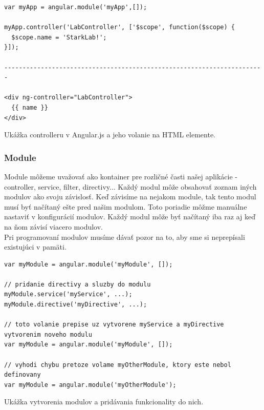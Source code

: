 \begin{algorithm}
\begin{lstlisting}
var myApp = angular.module('myApp',[]);

myApp.controller('LabController', ['$scope', function($scope) {
  $scope.name = 'StarkLab!';
}]);

-----------------------------------------------------------------------

<div ng-controller="LabController">
  {{ name }}
</div>
\end{lstlisting}
 \caption{Ukážka controlleru v Angular.js a jeho volanie na HTML elemente.}
 \label{angular-controller}
\end{algorithm}


\subsubsection{Module}
Module môžeme uvažovať ako kontainer pre rozličné časti našej aplikácie - controller, service, filter, directivy... Každý modul môže obsahovať zoznam iných modulov ako svoju závislosť. Keď závisíme na nejakom module, tak tento modul musí byť načítaný ešte pred našim modulom. Toto poriadie môžme manuálne nastaviť v konfigurácií modulov. Každý modul môže byť načítaný iba raz aj keď na ňom závisí viacero modulov.\cite{angular-docs}\\
Pri programovaní modulov musíme dávať pozor na to, aby sme si neprepísali existujúci v pamäti.

\begin{algorithm}
\begin{lstlisting}
var myModule = angular.module('myModule', []);

// pridanie directivy a sluzby do modulu
myModule.service('myService', ...);
myModule.directive('myDirective', ...);

// toto volanie prepise uz vytvorene myService a myDirective vytvorenim noveho modulu
var myModule = angular.module('myModule', []);

// vyhodi chybu pretoze volame myOtherModule, ktory este nebol definovany
var myModule = angular.module('myOtherModule');
\end{lstlisting}
 \caption{Ukážka vytvorenia modulov a pridávania funkcionality do nich.}
 \label{angular-module}
\end{algorithm}

